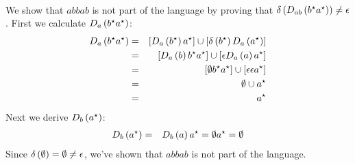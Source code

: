 \documentclass{article}
\begin{document}
\begin{exercise}
\begin{answer}
\paragraph{}
We show that $abbab$ is not part of the language by proving that $\delta\left( D_{ab}\left( b^{\star}a^{\star} \right) \right)\neq\epsilon$. First we calculate $D_a\left( b^{\star}a^{\star} \right)$:
\begin{eqnarray}
D_a\left( b^{\star}a^{\star} \right)&=&\left[ D_a\left( b^{\star} \right)a^{\star} \right]\cup\left[ \delta\left( b^{\star} \right)D_a\left( a^{\star} \right) \right]\\
&=&\left[ D_a\left( b \right)b^{\star}a^{\star} \right]\cup\left[ \epsilon D_a\left( a \right)a^{\star} \right]\\
&=&\left[ \emptyset b^{\star}a^{\star} \right]\cup\left[ \epsilon\epsilon a^{\star} \right]\\
&=&\emptyset\cup a^{\star}\\
&=&a^{\star}
\end{eqnarray}
Next we derive $D_b\left( a^{\star} \right)$:
\begin{eqnarray}
D_b\left( a^{\star} \right)&=&D_b\left( a \right)a^{\star}=\emptyset a^{\star}=\emptyset
\end{eqnarray}
Since $\delta\left( \emptyset \right)=\emptyset\neq\epsilon$, we've shown that $abbab$ is not part of the language.
\end{answer}
\end{exercise}
\end{document}
